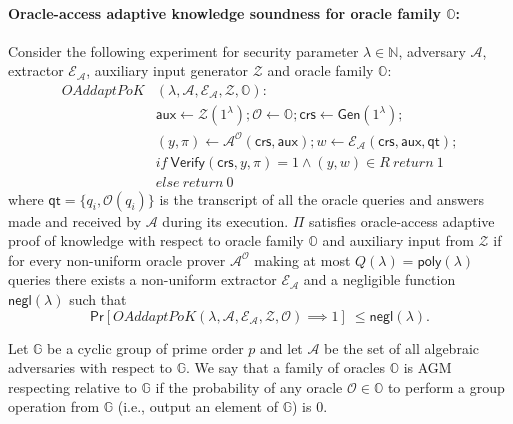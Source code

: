 \begin{definition}
\paragraph{Oracle-access adaptive knowledge soundness for oracle family $\mathbb{O}$:} Consider the following experiment for security 
parameter $\lambda \in \mathbb{N}$, adversary $\mathcal{A}$, extractor $\mathcal{E}_{\mathcal{A}}$, auxiliary 
input generator $\mathcal{Z}$ and oracle family $\mathbb{O}$:\\
\begin{align*}
\mathit{OAddaptPoK}&(\lambda, \mathcal{A}, \mathcal{E}_{\mathcal{A}}, \mathcal{Z}, \mathbb{O}): \\
& \mathsf{aux} \leftarrow \mathcal{Z}(1^{\lambda}); \mathcal{O} \leftarrow \mathbb{O}; \mathsf{crs} \leftarrow \mathsf{Gen}(1^{\lambda}); \\
& (y,\pi) \leftarrow \mathcal{A}^{\mathcal{O}}(\mathsf{crs},\mathsf{aux}); w \leftarrow \mathcal{E}_{\mathcal{A}}(\mathsf{crs}, \mathsf{aux}, \mathsf{qt}); \\
& if \ \mathsf{Verify}(\mathsf{crs}, y, \pi) = 1 \wedge (y,w) \in R \ return  \ 1 \\
& else \ return \ 0
\end{align*}
\noindent where $\mathsf{qt} = \{q_i, \mathcal{O}(q_i)\}$ is the transcript of all the oracle queries and answers made and received by 
$\mathcal{A}$ during its execution. $\Pi$ satisfies oracle-access adaptive proof of knowledge with respect to oracle family  $\mathbb{O}$ and auxiliary 
input from $\mathcal{Z}$ if for every non-uniform oracle prover $\mathcal{A}^{\mathcal{O}}$  
making at most $Q(\lambda) = \mathsf{poly}(\lambda)$ queries there exists a non-uniform extractor $\mathcal{E}_{\mathcal{A}}$ 
and a negligible function $\mathsf{negl}(\lambda)$ such that 
$$\mathsf{Pr}[\mathit{OAddaptPoK}(\lambda, \mathcal{A}, \mathcal{E}_{\mathcal{A}}, \mathcal{Z}, \mathcal{O}) \implies  1]\ \leq \mathsf{negl}(\lambda).$$ 
\end{definition} 

\begin{definition}
\label{def:agm_oracles}
Let $\mathbb{G}$ be a cyclic group of prime order $p$ and let $\mathcal{A}$ be the set of all algebraic adversaries with 
respect to $\mathbb{G}$. We say that a family of oracles $\mathbb{O}$ is AGM respecting relative to $\mathbb{G}$ if 
the probability of any oracle $\mathcal{O} \in \mathbb{O}$ to perform a group operation from $\mathbb{G}$ 
(i.e., output an element of $\mathbb{G}$) is $0$. 
\end{definition}

